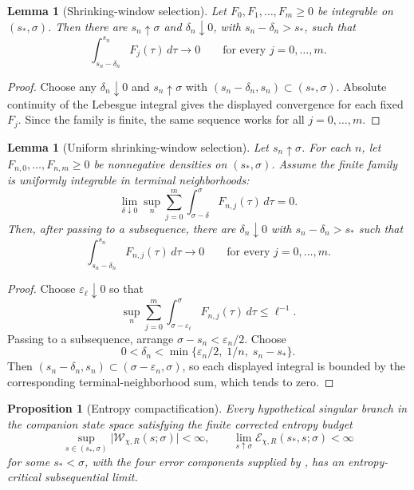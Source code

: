 \documentclass[11pt]{amsart}
\numberwithin{equation}{section}
\theoremstyle{plain}
\newtheorem{proposition}[theorem]{Proposition}
\newtheorem{lemma}[theorem]{Lemma}
\theoremstyle{definition}
\theoremstyle{remark}
\newcommand{\Wloc}{\mathcal W}
\newcommand{\Err}{\mathcal E}
\begin{document}
\begin{lemma}[Shrinking-window selection]
\label{lem:shrinking-window-selection}
Let \(F_0,F_1,\dots,F_m\ge0\) be integrable on \((s_*,\sigma)\).  Then
there are \(s_n\uparrow\sigma\) and \(\delta_n\downarrow0\), with
\(s_n-\delta_n>s_*\), such that
\[
	\int_{s_n-\delta_n}^{s_n}F_j(\tau)\,d\tau\to0
	\qquad\text{for every }j=0,\dots,m.
\]
\end{lemma}

\begin{proof}
Choose any \(\delta_n\downarrow0\) and \(s_n\uparrow\sigma\) with
\((s_n-\delta_n,s_n)\subset(s_*,\sigma)\).  Absolute continuity of the
Lebesgue integral gives the displayed convergence for each fixed \(F_j\).
Since the family is finite, the same sequence works for all \(j=0,\dots,m\).
\end{proof}

\begin{lemma}[Uniform shrinking-window selection]
\label{lem:uniform-shrinking-window-selection}
Let \(s_n\uparrow\sigma\).  For each \(n\), let
\(F_{n,0},\dots,F_{n,m}\ge0\) be nonnegative densities on
\((s_*,\sigma)\).  Assume the finite family is uniformly integrable in
terminal neighborhoods:
\[
	\lim_{\delta\downarrow0}
	\sup_n\sum_{j=0}^m\int_{\sigma-\delta}^{\sigma}F_{n,j}(\tau)\,d\tau=0.
\]
Then, after passing to a subsequence, there are \(\delta_n\downarrow0\) with
\(s_n-\delta_n>s_*\) such that
\[
	\int_{s_n-\delta_n}^{s_n}F_{n,j}(\tau)\,d\tau\to0
	\qquad\text{for every }j=0,\dots,m.
\]
\end{lemma}

\begin{proof}
Choose \(\varepsilon_\ell\downarrow0\) so that
\[
	\sup_n\sum_{j=0}^m
	\int_{\sigma-\varepsilon_\ell}^{\sigma}F_{n,j}(\tau)\,d\tau
	\le \ell^{-1}.
\]
Passing to a subsequence, arrange \(\sigma-s_n<\varepsilon_n/2\).  Choose
\[
	0<\delta_n<\min\{\varepsilon_n/2,\;1/n,\;s_n-s_*\}.
\]
Then \((s_n-\delta_n,s_n)\subset(\sigma-\varepsilon_n,\sigma)\), so each
displayed integral is bounded by the corresponding terminal-neighborhood
sum, which tends to zero.
\end{proof}

\begin{proposition}[Entropy compactification]
\label{prop:entropy-compactification}
Every hypothetical singular branch in the companion state space satisfying
the finite corrected entropy budget
\[
	\sup_{s\in(s_*,\sigma)}\bigl|\Wloc_{\chi,R}(s;\sigma)\bigr|<\infty,
	\qquad
	\lim_{s\uparrow\sigma}\Err_{\chi,R}(s_*,s;\sigma)<\infty
\]
for some \(s_*<\sigma\), with the four error components supplied by
, has an entropy-critical subsequential
limit.
\end{proposition}
\end{document}

